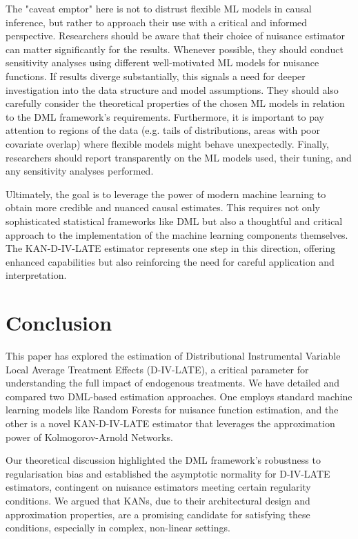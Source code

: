 \documentclass[final,3p,fleqn, 10pt]{elsarticle}
\begin{document}
The "caveat emptor" here is not to distrust flexible ML models in causal inference, but rather to approach their use with a critical and informed perspective. Researchers should be aware that their choice of nuisance estimator can matter significantly for the results. Whenever possible, they should conduct sensitivity analyses using different well-motivated ML models for nuisance functions. If results diverge substantially, this signals a need for deeper investigation into the data structure and model assumptions. They should also carefully consider the theoretical properties of the chosen ML models in relation to the DML framework's requirements. Furthermore, it is important to pay attention to regions of the data (e.g. tails of distributions, areas with poor covariate overlap) where flexible models might behave unexpectedly. Finally, researchers should report transparently on the ML models used, their tuning, and any sensitivity analyses performed.

Ultimately, the goal is to leverage the power of modern machine learning to obtain more credible and nuanced causal estimates. This requires not only sophisticated statistical frameworks like DML but also a thoughtful and critical approach to the implementation of the machine learning components themselves. The KAN-D-IV-LATE estimator represents one step in this direction, offering enhanced capabilities but also reinforcing the need for careful application and interpretation.

\section{Conclusion}
\label{sec:conclusion}

This paper has explored the estimation of Distributional Instrumental Variable Local Average Treatment Effects (D-IV-LATE), a critical parameter for understanding the full impact of endogenous treatments. We have detailed and compared two DML-based estimation approaches. One employs standard machine learning models like Random Forests for nuisance function estimation, and the other is a novel KAN-D-IV-LATE estimator that leverages the approximation power of Kolmogorov-Arnold Networks.

Our theoretical discussion highlighted the DML framework's robustness to regularisation bias and established the asymptotic normality for D-IV-LATE estimators, contingent on nuisance estimators meeting certain regularity conditions. We argued that KANs, due to their architectural design and approximation properties, are a promising candidate for satisfying these conditions, especially in complex, non-linear settings.
\end{document}
